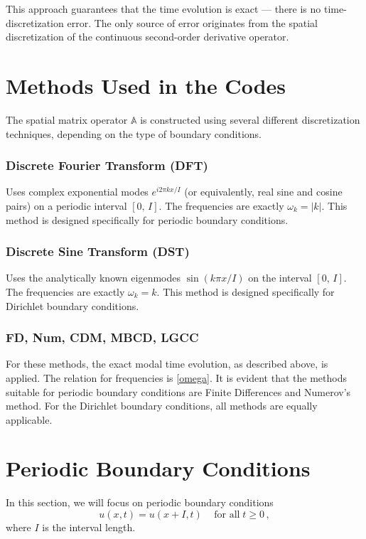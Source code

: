 \documentclass[11pt,a4paper,oneside,openright]{report} %
\begin{document}
This approach guarantees that the time evolution is exact — there is no time-discretization error. The only source of error originates from the spatial discretization of the continuous second-order derivative operator.


\section{Methods Used in the Codes}
\noindent
The spatial matrix operator $\mathbb{A}$ is constructed using several different discretization techniques, depending on the type of boundary conditions.

\subsubsection*{Discrete Fourier Transform (DFT)}
\noindent
Uses complex exponential modes $e^{i 2\pi k x / I}$ (or equivalently, real sine and cosine pairs) on a periodic interval $[0, \, I]$. The frequencies are exactly $\omega_k = |k|$. This method is designed specifically for periodic boundary conditions. 

\subsubsection*{Discrete Sine Transform (DST)}
\noindent
Uses the analytically known eigenmodes $\sin(k \pi x/I)$ on the interval $[0, \, I]$. The frequencies are exactly $\omega_k = k$. This method is designed specifically for Dirichlet boundary conditions.

\subsubsection*{FD, Num, CDM, MBCD, LGCC}
\noindent
For these methods, the exact modal time evolution, as described above, is applied. The relation for frequencies is \eqref{omega}. It is evident that the methods suitable for periodic boundary conditions are Finite Differences and Numerov's method. For the Dirichlet boundary conditions, all methods are equally applicable.
    



\section{Periodic Boundary Conditions}
\noindent
In this section, we will focus on periodic boundary conditions
\begin{equation}
    u(x, t) = u(x + I, t) \,   \quad \text{for all} \; t \geq 0 \, ,
\end{equation}
where $I$ is the interval length.
\end{document}
